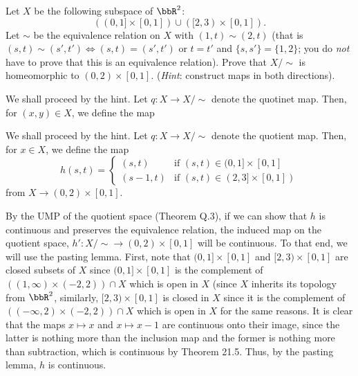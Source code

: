 \begin{problem}
  Let \(X\) be the following subspace of \(\bbR^2\):
  \[
    ((0,1]\times[0,1])\cup([2,3)\times[0,1]).
  \]
  Let \(\sim\) be the equivalence relation on \(X\) with \((1,t)\sim(2,t)\)
  (that is \((s,t)\sim(s',t')\iff(s,t)=(s',t')\) or \(t=t'\) and
  \(\{s,s'\}=\{1,2\}\); you do \emph{not} have to prove that this is an
  equivalence relation). Prove that \(X/{\sim}\) is homeomorphic to
  \((0,2)\times[0,1]\). (\emph{Hint}: construct maps in both directions).
\end{problem}
\begin{solution}
  We shall proceed by the hint. Let \(q\colon X\to X/{\sim}\) denote the
  quotinet map. Then, for \((x,y)\in X\), we define the map

  We shall proceed by the hint. Let \(q\colon X\to X/{\sim}\) denote the
  quotient map. Then, for \(x\in X\), we define the map
  \[
    h(s,t)=
    \begin{cases}
      (s,t)&\text{if \((s,t)\in(0,1]\times[0,1]\)}\\
      (s-1,t)&\text{if \((s,t)\in(2,3]\times[0,1])\)}
    \end{cases}
  \]
  from \(X\to(0,2)\times[0,1]\).

  By the UMP of the quotient space (Theorem Q.3), if we can show that \(h\)
  is continuous and preserves the equivalence relation, the induced map on
  the quotient space, \(h'\colon X/{\sim}\to (0,2)\times[0,1]\) will be
  continuous. To that end, we will use the pasting lemma. First, note that
  \((0,1]\times[0,1]\) and \([2,3)\times[0,1]\) are closed subsets of \(X\)
  since \((0,1]\times[0,1]\) is the complement of
  \(((1,\infty)\times (-2,2))\cap X\) which is open in \(X\) (since \(X\)
  inherits its topology from \(\bbR^2\), similarly, \([2,3)\times[0,1]\) is
  closed in \(X\) since it is the complement of
  \(((-\infty,2)\times(-2,2))\cap X\) which is open in \(X\) for the same
  reasons. It is clear that the maps \(x\mapsto x\) and \(x\mapsto x-1\)
  are continuous onto their image, since the latter is nothing more than
  the inclusion map and the former is nothing more than subtraction, which
  is continuous by Theorem 21.5. Thus, by the pasting lemma, \(h\) is
  continuous.


\end{solution}
